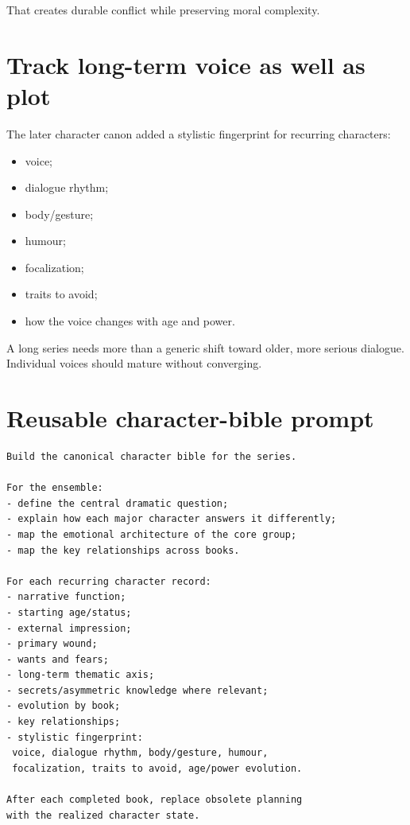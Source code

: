 \documentclass[11pt,oneside,openany]{book}
\providecommand{\tightlist}{%
  \setlength{\itemsep}{0pt}\setlength{\parskip}{0pt}}
\begin{document}
That creates durable conflict while preserving moral complexity.

\section{Track long-term voice as well as plot}\label{track-long-term-voice-as-well-as-plot}

The later character canon added a stylistic fingerprint for recurring characters:

\begin{itemize}
\tightlist
\item
  voice;
\item
  dialogue rhythm;
\item
  body/gesture;
\item
  humour;
\item
  focalization;
\item
  traits to avoid;
\item
  how the voice changes with age and power.
\end{itemize}

A long series needs more than a generic shift toward older, more serious dialogue. Individual voices should mature without converging.

\section{Reusable character-bible prompt}\label{reusable-character-bible-prompt}

\begin{lstlisting}
Build the canonical character bible for the series.

For the ensemble:
- define the central dramatic question;
- explain how each major character answers it differently;
- map the emotional architecture of the core group;
- map the key relationships across books.

For each recurring character record:
- narrative function;
- starting age/status;
- external impression;
- primary wound;
- wants and fears;
- long-term thematic axis;
- secrets/asymmetric knowledge where relevant;
- evolution by book;
- key relationships;
- stylistic fingerprint:
 voice, dialogue rhythm, body/gesture, humour,
 focalization, traits to avoid, age/power evolution.

After each completed book, replace obsolete planning
with the realized character state.
\end{lstlisting}
\end{document}
